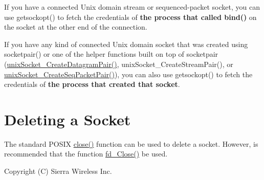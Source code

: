 If you have a connected Unix domain stream or sequenced-\/packet socket, you can use getsockopt() to fetch the credentials of {\bfseries the process that called bind()} on the socket at the other end of the connection.

If you have any kind of connected Unix domain socket that was created using socketpair() or one of the helper functions built on top of socketpair (\hyperlink{unix_socket_8h_a662207caa2695a24ff5abdbd82342a66}{unix\+Socket\+\_\+\+Create\+Datagram\+Pair()}, unix\+Socket\+\_\+\+Create\+Stream\+Pair(), or \hyperlink{unix_socket_8h_a9eb8d8b2e6802827529abf2ad90f6ff6}{unix\+Socket\+\_\+\+Create\+Seq\+Packet\+Pair()}), you can also use getsockopt() to fetch the credentials of {\bfseries the process that created that socket}.


\hypertarget{c_unixSockets_c_unixSocketsDeleting}{}\section{Deleting a Socket}\label{c_unixSockets_c_unixSocketsDeleting}
The standard P\+O\+S\+IX \hyperlink{app_stop_client_8c_ac9aa243805b0ac0687f9c2e9b5bdb8ef}{close()} function can be used to delete a socket. However, is recommended that the function \hyperlink{file_descriptor_8c_ac66047067b00ef0ccc70e0ee7d70dd79}{fd\+\_\+\+Close()} be used.





Copyright (C) Sierra Wireless Inc. 